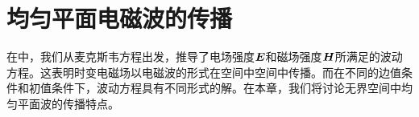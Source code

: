 \chapter{均匀平面电磁波的传播}

在中，我们从麦克斯韦方程出发，推导了电场强度$\vb*{E}$和磁场强度$\vb*{H}$所满足的波动方程。这表明时变电磁场以电磁波的形式在空间中空间中传播。而在不同的边值条件和初值条件下，波动方程具有不同形式的解。在本章，我们将讨论无界空间中均匀平面波的传播特点。


